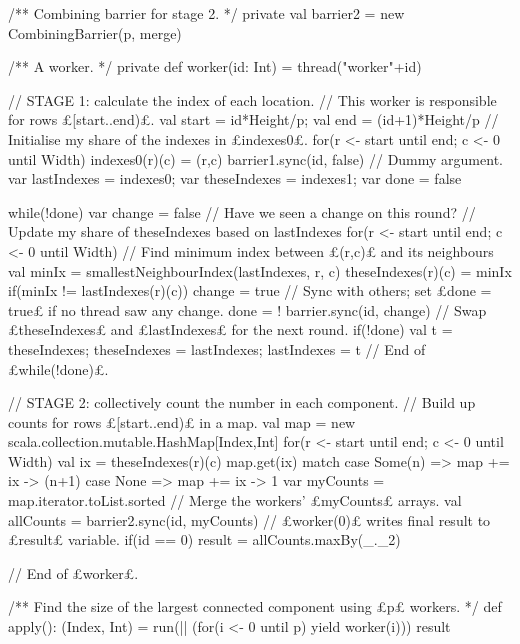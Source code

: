 \begin{answer}
\begin{scala}
{  /** Combining barrier for stage 2. */
  private val barrier2 = new CombiningBarrier(p, merge)

  /** A worker. */
  private def worker(id: Int) = thread("worker"+id){
    // STAGE 1: calculate the index of each location.
    // This worker is responsible for rows £[start..end)£.
    val start = id*Height/p; val end = (id+1)*Height/p
    // Initialise my share of the indexes in £indexes0£.
    for(r <- start until end; c <- 0 until Width) indexes0(r)(c) = (r,c)
    barrier1.sync(id, false) // Dummy argument.
    var lastIndexes = indexes0; var theseIndexes = indexes1; var done = false

    while(!done){
      var change = false // Have we seen a change on this round?
      // Update my share of theseIndexes based on lastIndexes
      for(r <- start until end; c <- 0 until Width){
        // Find minimum index between £(r,c)£ and its neighbours
        val minIx = smallestNeighbourIndex(lastIndexes, r, c)
        theseIndexes(r)(c) = minIx
        if(minIx != lastIndexes(r)(c)) change = true
      }
      // Sync with others; set £done = true£ if no thread saw any change.
      done = ! barrier.sync(id, change)
      // Swap £theseIndexes£ and £lastIndexes£ for the next round.
      if(!done){ val t = theseIndexes; theseIndexes = lastIndexes; lastIndexes = t }
    } // End of £while(!done)£.

    // STAGE 2: collectively count the number in each component.
    // Build up counts for rows £[start..end)£ in a map.
    val map = new scala.collection.mutable.HashMap[Index,Int]
    for(r <- start until end; c <- 0 until Width){
      val ix = theseIndexes(r)(c)
      map.get(ix) match{
        case Some(n) => map += ix -> (n+1)
        case None => map += ix -> 1
      }
    }
    var myCounts = map.iterator.toList.sorted
    // Merge the workers' £myCounts£ arrays.
    val allCounts = barrier2.sync(id, myCounts)
    // £worker(0)£ writes final result to £result£ variable.
    if(id == 0) result = allCounts.maxBy(_._2)
  } // End of £worker£.


  /** Find the size of the largest connected component using £p£ workers. */
  def apply(): (Index, Int) = {
    run(|| (for(i <- 0 until p) yield worker(i)))
    result
  }
}
\end{scala}


\end{answer}
